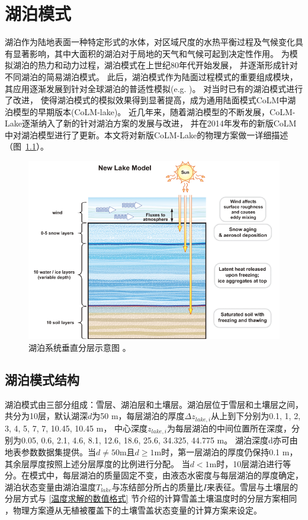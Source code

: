 \chapter{湖泊模式}
湖泊作为陆地表面一种特定形式的水体，对区域尺度的水热平衡过程及气候变化具有显著影响，其中大面积的湖泊对于局地的天气和气候可起到决定性作用。
为模拟湖泊的热力和动力过程，湖泊模式在上世纪80年代开始发展\citep{henderson1985new}，
并逐渐形成针对不同湖泊的简易湖泊模式\citep{hostetler1993interactive,hostetler1994lake,hostetler1990simulation}。
此后，湖泊模式作为陆面过程模式的重要组成模块，其应用逐渐发展到针对全球湖泊的普适性模拟(e.g. \citet{bonan1995sensitivity,bonan1996land})。
\citet{zeng2002coupling}对当时已有的湖泊模式进行了改进，
使得湖泊模式的模拟效果得到显著提高，成为通用陆面模式CoLM中湖泊模型的早期版本(CoLM-lake)。
近几年来，随着湖泊模型的不断发展，CoLM-Lake逐渐纳入了新的针对湖泊方案的发展与改进，
并在2014年发布的新版CoLM中对湖泊模型进行了更新。本文将对新版CoLM-Lake的物理方案做一详细描述（图~\ref{fig:湖泊系统垂直分层示意图}）。
{
\begin{figure}[]
\centering
\includegraphics{Figures/湖泊模式/湖泊系统垂直分层示意图.png}
\caption{湖泊系统垂直分层示意图 \citep{subin2012improved}。}
\label{fig:湖泊系统垂直分层示意图}
\end{figure}
}

\section{湖泊模式结构}
湖泊模式由三部分组成：雪层、湖泊层和土壤层。湖泊层位于雪层和土壤层之间，
共分为10层，默认湖深$d$为50 m，每层湖泊的厚度$\Delta z_{lake,i}$从上到下分别为0.1, 1, 2, 3, 4, 5, 7, 7, 10.45, 10.45 m，
中心深度$z_{lake,i}$为每层湖泊的中间位置所在深度，分别为0.05, 0.6, 2.1, 4.6, 8.1, 12.6, 18.6, 25.6, 34.325, 44.775 m。
湖泊深度d亦可由地表参数数据集提供。当$d\neq50$m且$d\geq1$m时，第一层湖泊的厚度仍保持0.1 m，
其余层厚度按照上述分层厚度的比例进行分配。
当$d<1$m时，10层湖泊进行等分。在模式中，每层湖泊的质量固定不变，由液态水密度与每层湖泊的厚度确定，
湖泊状态变量由湖泊温度$T_{lake}$与冻结部分所占的质量比$I$来表征。雪层与土壤层的分层方式与 \ref{温度求解的数值格式} 节介绍的计算雪盖土壤温度时的分层方案相同
，物理方案遵从无植被覆盖下的土壤雪盖状态变量的计算方案来设定。
